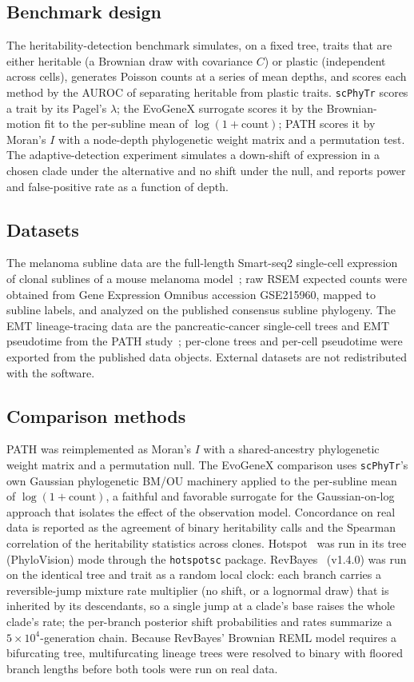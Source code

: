 \documentclass{article}
\newcommand{\scphytr}{\texttt{scPhyTr}}
\begin{document}
\subsection*{Benchmark design}
The heritability-detection benchmark simulates, on a fixed tree, traits that are either
heritable (a Brownian draw with covariance $C$) or plastic (independent across cells),
generates Poisson counts at a series of mean depths, and scores each method by the AUROC of
separating heritable from plastic traits. \scphytr{} scores a trait by its Pagel's $\lambda$;
the EvoGeneX surrogate scores it by the Brownian-motion fit to the per-subline mean of
$\log(1+\text{count})$; PATH scores it by Moran's $I$ with a node-depth phylogenetic weight
matrix and a permutation test. The adaptive-detection experiment simulates a down-shift of
expression in a chosen clade under the alternative and no shift under the null, and reports
power and false-positive rate as a function of depth.

\subsection*{Datasets}
The melanoma subline data are the full-length Smart-seq2 single-cell expression of clonal
sublines of a mouse melanoma model~\cite{hirsch_emt_2025}; raw RSEM expected counts were
obtained from Gene Expression Omnibus accession GSE215960, mapped to subline labels, and
analyzed on the published consensus subline phylogeny. The EMT lineage-tracing data are the
pancreatic-cancer single-cell trees and EMT pseudotime from the PATH
study~\cite{schiffman_path_2024, simeonov_emt_2021}; per-clone trees and per-cell pseudotime
were exported from the published data objects. External datasets are not redistributed with
the software.

\subsection*{Comparison methods}
PATH was reimplemented as Moran's $I$ with a shared-ancestry phylogenetic weight matrix and a
permutation null. The EvoGeneX comparison uses \scphytr{}'s own Gaussian phylogenetic
BM/OU machinery applied to the per-subline mean of $\log(1+\text{count})$, a faithful and
favorable surrogate for the Gaussian-on-log approach that isolates the effect of the
observation model. Concordance on real data is reported as the agreement of binary
heritability calls and the Spearman correlation of the heritability statistics across clones.
Hotspot~\cite{detomaso_hotspot_2021} was run in its tree (PhyloVision) mode through the
\texttt{hotspotsc} package. RevBayes~\cite{hohna_revbayes_2016} (v1.4.0) was run on the
identical tree and trait as a random local clock: each branch carries a reversible-jump
mixture rate multiplier (no shift, or a lognormal draw) that is inherited by its descendants,
so a single jump at a clade's base raises the whole clade's rate; the per-branch posterior
shift probabilities and rates summarize a $5\times10^4$-generation chain. Because RevBayes'
Brownian REML model requires a bifurcating tree, multifurcating lineage trees were resolved
to binary with floored branch lengths before both tools were run on real data.
\end{document}
